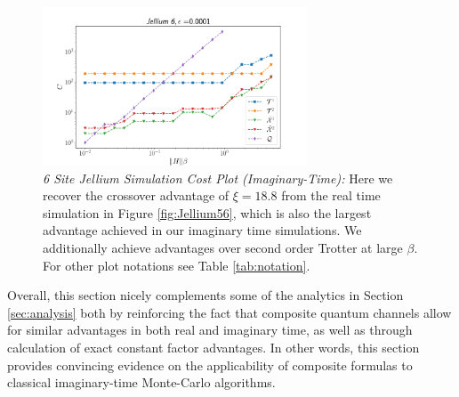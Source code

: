 \begin{figure}[htbp!]
    \centering
    \includegraphics[width=0.7\textwidth]{composite_numerics/iJellium6.png}
    \caption{\textit{6 Site Jellium Simulation Cost Plot (Imaginary-Time):} Here we recover the  crossover advantage of $\xi = 18.8$ from the real time simulation in Figure \ref{fig:Jellium56}, which is also the largest advantage achieved in our imaginary time simulations. We additionally achieve advantages over second order Trotter at large $\beta$. For other plot notations see Table \ref{tab:notation}.} \label{fig:iJellium6}
\end{figure} 
\FloatBarrier

Overall, this section nicely complements some of the analytics in Section \ref{sec:analysis} both by reinforcing the fact that composite quantum channels allow for similar advantages in both real and imaginary time, as well as through calculation of exact constant factor advantages. In other words, this section provides convincing evidence on the applicability of composite formulas to classical imaginary-time Monte-Carlo algorithms.


